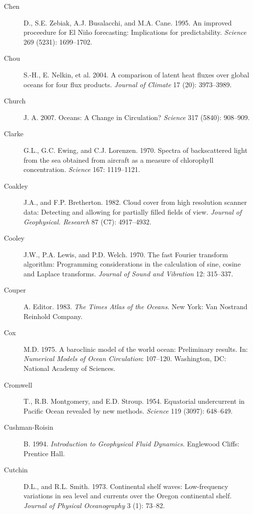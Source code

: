 \begin{description}
\item [Chen]D., S.E. Zebiak, A.J. Busalacchi, and M.A. Cane. 1995. An
  improved proceedure for El Ni\~{n}o forecasting: Implications for
  predictability.  \textit{Science} 269 (5231): 1699--1702.

\item [Chou]S.-H., E. Nelkin, et al. 2004. A comparison of latent heat
  fluxes over global oceans for four flux products. \textit{Journal of
    Climate} 17 (20): 3973--3989.

\item [Church]J. A. 2007. Oceans: A Change in Circulation?
  \textit{Science} 317 (5840): 908--909.
	
\item [Clarke]G.L., G.C. Ewing, and C.J. Lorenzen. 1970. Spectra of
  backscattered light from the sea obtained from aircraft as a measure
  of chlorophyll concentration. \textit{Science} 167: 1119--1121.

\item [Coakley]J.A., and F.P. Bretherton. 1982. Cloud cover from high
  resolution scanner data: Detecting and allowing for partially filled
  fields of view. \textit{Journal of Geophysical. Research} 87 (C7):
  4917--4932.

\item [Cooley]J.W., P.A. Lewis, and P.D. Welch. 1970. The fast Fourier
  transform algorithm: Programming considerations in the calculation
  of sine, cosine and Laplace transforms. \textit{Journal of Sound and
    Vibration} 12: 315--337.

\item [Couper]A. Editor. 1983. \textit{The Times Atlas of the
  Oceans}. New York: Van Nostrand Reinhold Company.

\item [Cox]M.D. 1975. A baroclinic model of the world ocean:
  Preliminary results. In: \textit{Numerical Models of Ocean
    Circulation}: 107--120. Washington, DC: National Academy of
  Sciences.

\item [Cromwell]T., R.B. Montgomery, and E.D. Stroup. 1954. Equatorial
  undercurrent in Pacific Ocean revealed by new
  methods. \textit{Science} 119 (3097): 648--649.

\item[Cushman-Roisin]B. 1994. \textit{Introduction to Geophysical
  Fluid Dynamics}.  Englewood Cliffs: Prentice Hall.

\item[Cutchin]D.L., and R.L. Smith. 1973. Continental shelf waves:
  Low-frequency variations in sea level and currents over the Oregon
  continental shelf. \textit{Journal of Physical Oceanography} 3 (1):
  73--82.


\end{description}
